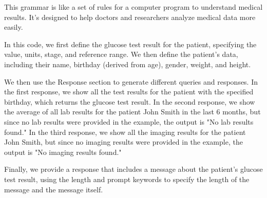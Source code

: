 This grammar is like a set of rules for a computer program to understand medical results. It's designed to help doctors and researchers analyze medical data more easily.

In this code, we first define the glucose test result for the patient, specifying the value, units, stage, and reference range. We then define the patient's data, including their name, birthday (derived from age), gender, weight, and height.

We then use the Response section to generate different queries and responses. In the first response, we show all the test results for the patient with the specified birthday, which returns the glucose test result. In the second response, we show the average of all lab results for the patient John Smith in the last 6 months, but since no lab results were provided in the example, the output is "No lab results found." In the third response, we show all the imaging results for the patient John Smith, but since no imaging results were provided in the example, the output is "No imaging results found."

Finally, we provide a response that includes a message about the patient's glucose test result, using the length and prompt keywords to specify the length of the message and the message itself.